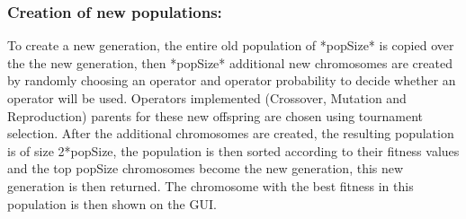 \documentclass{article}
\begin{document}
\subsubsection*{Creation of new populations:}
To create a new generation, the entire old population of *popSize* is copied over the the new generation, then *popSize* additional new chromosomes are created by randomly choosing an operator and operator probability to decide whether an operator will be used. Operators implemented (Crossover, Mutation and Reproduction) parents for these new offspring are chosen using tournament selection. After the additional chromosomes are created, the resulting population is of size 2*popSize, the population is then sorted according to their fitness values and the top popSize chromosomes become the new generation, this new generation is then returned. The chromosome with the best fitness in this population is then shown on the GUI.
\end{document}

